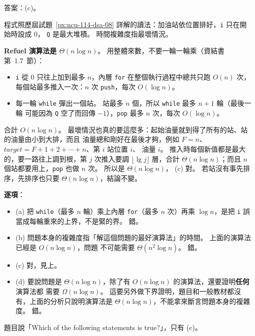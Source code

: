 \begin{pastsoln}
答案：(c)。

程式照歷屆試題~\ref{px:ncu-114-dsa-08} 詳解的讀法：加油站依位置排好，\texttt{i} 只在開始時設成 $0$，
\texttt{Q} 是最大堆積。 時間複雜度指最壞情況。

\textbf{Refuel 演算法是 $\Theta(n \log n)$}。 用整體來數，不要一輪一輪乘（資結書第~1.7~節）：
\begin{itemize}
\item \texttt{i} 從 $0$ 只往上加到最多 $n$，內層 \texttt{for} 在整個執行過程中總共只跑 $O(n)$ 次，
每個站最多推入一次：$n$ 次 \texttt{push}，每次 $O(\log n)$。
\item 每一輪 \texttt{while} 彈出一個站。 站最多 $n$ 個，所以 \texttt{while} 最多 $n + 1$ 輪（最後一輪
可能因為 \texttt{Q} 空了而回傳 $-1$），\texttt{pop} 最多 $n$ 次，每次 $O(\log n)$。
\end{itemize}
合計 $O(n \log n)$。 最壞情況也真的要這麼多：起始油量就到得了所有的站、站的油量由小到大排，而且
油量總和剛好在最後才夠，例如 $F = n$、$\mathit{target} = F + 1 + 2 + \cdots + n$、第 $i$ 站位置 $i$、
油量 $i$。 推入時每個新值都是最大的，要一路往上調到根，第 $j$ 次推入要調 $\lfloor\lg j\rfloor$ 層，合計
$\Theta(n \log n)$；而且 $n$ 個站都要用上，\texttt{pop} 也做 $n$ 次。 所以是 $\Theta(n \log n)$，
(c) 對。 若站沒有事先排序，先排序也只要 $\Theta(n \log n)$，結論不變。

\textbf{逐項}：
\begin{itemize}
\item (a) 把 \texttt{while}（最多 $n$ 輪）乘上內層 \texttt{for}（最多 $n$ 次）再乘 $\log n$，是把
\texttt{i} 誤當成每輪重來的上界，不是緊的界。 錯。
\item (b) 問題本身的複雜度指「解這個問題的最好演算法」的時間。 上面的演算法已經是 $O(n \log n)$，問題
不可能需要 $\Theta(n^2 \log n)$。 錯。
\item (c) 對，見上。
\item (d) 要說問題是 $\Theta(n \log n)$，除了有 $O(n \log n)$ 的演算法，還要證明\textbf{任何}演算法都
需要 $\Omega(n \log n)$。 這要另外做下界證明，題目和一般教材都沒有，上面的分析只說明演算法是 $\Theta(n \log n)$，不能拿來斷言問題本身的複雜度。 錯。
\end{itemize}
題目說「Which of the following statements is true?」，只有 (c)。
\end{pastsoln}
